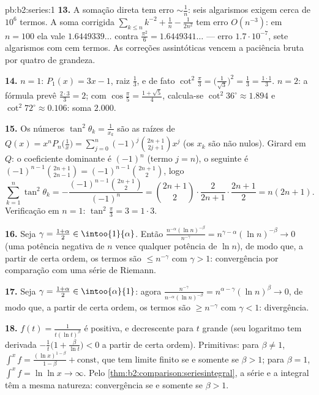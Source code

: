\begin{solution}{pb:b2:series:1}
\textbf{13.} A somação direta tem erro $\sim \frac1n$: seis
algarismos exigem cerca de $10^6$ termos. A soma corrigida
$\sum_{k\leq n}k^{-2} + \frac1n - \frac1{2n^2}$ tem erro
$O(n^{-3})$: em $n = 100$ ela vale $1.6449339\dots$ contra
$\frac{\pi^2}6 = 1.6449341\dots$ --- erro $1.7\cdot10^{-7}$,
sete algarismos com cem termos. As correções assintóticas vencem
a paciência bruta por quatro  de grandeza.

\textbf{14.} $n = 1$: $P_1(x) = 3x - 1$, raiz $\frac13$, e
de fato $\cot^2\frac\pi3 = \bigl(\frac1{\sqrt3}\bigr)^2 =
\frac13 = \frac{1\cdot1}3$. $n = 2$: a fórmula prevê
$\frac{2\cdot3}3 = 2$; com $\cos\frac\pi5 = \frac{1 +
\sqrt5}{4}$, calcula-se $\cot^2 36^\circ \approx 1.894$ e
$\cot^2 72^\circ \approx 0.106$: soma $2.000$.

\textbf{15.} Os números $\tan^2\theta_k = \frac1{x_k}$ são as
raízes de $Q(x) = x^nP_n\bigl(\frac1x\bigr) =
\sum_{j=0}^n(-1)^j\binom{2n+1}{2j+1}x^j$ (os $x_k$ são
não nulos). Girard em $Q$: o coeficiente dominante é $(-1)^n$
(termo $j = n$), o seguinte é $(-1)^{n-1}\binom{2n+1}{2n-1} =
(-1)^{n-1}\binom{2n+1}{2}$, logo
\[
\sum_{k=1}^n\tan^2\theta_k =
-\frac{(-1)^{n-1}\binom{2n+1}2}{(-1)^n} = \binom{2n+1}2\cdot
\frac{2}{2n+1}\cdot\frac{2n+1}{2}
= n(2n+1).
\]
Verificação em $n = 1$: $\tan^2\frac\pi3 = 3 = 1\cdot3$.

\textbf{16.} Seja $\gamma = \frac{1+\alpha}2 \in
\intoo{1}{\alpha}$. Então $\frac{n^{-\alpha}(\ln
n)^{-\beta}}{n^{-\gamma}} = n^{\gamma - \alpha}(\ln n)^{-\beta}
\to 0$ (uma potência negativa de $n$ vence qualquer potência de $\ln n$), de modo que,
a partir de certa ordem, os termos são $\leq n^{-\gamma}$ com $\gamma > 1$:
convergência por comparação com uma série de Riemann.

\textbf{17.} Seja $\gamma = \frac{1+\alpha}2 \in
\intoo{\alpha}{1}$: agora $\frac{n^{-\gamma}}{n^{-\alpha}(\ln
n)^{-\beta}} = n^{\alpha-\gamma}(\ln n)^{\beta} \to 0$, de modo que,
a partir de certa ordem, os termos são $\geq n^{-\gamma}$ com $\gamma < 1$:
divergência.

\textbf{18.} $f(t) = \frac1{t(\ln t)^\beta}$ é positiva,
 e decrescente para $t$ grande (seu logaritmo tem
derivada $-\frac1t\bigl(1 + \frac{\beta}{\ln t}\bigr) < 0$
a partir de certa ordem). Primitivas: para $\beta \neq 1$,
$\int^x f = \frac{(\ln x)^{1-\beta}}{1-\beta} + \text{const}$,
que tem limite finito se e somente se $\beta > 1$; para $\beta = 1$,
$\int^x f = \ln\ln x \to \infty$. Pelo
\cref{thm:b2:comparison:seriesintegral}, a série e a
integral têm a mesma natureza: convergência se e somente se $\beta > 1$.


\end{solution}
